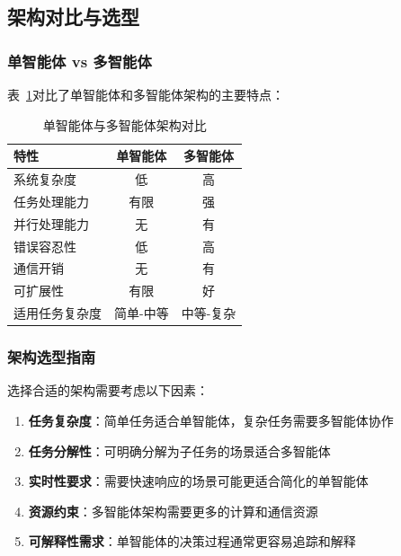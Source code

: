 \subsection{架构对比与选型}

\subsubsection{单智能体 vs 多智能体}

表~\ref{tab:architecture-comparison}对比了单智能体和多智能体架构的主要特点：

\begin{table}[htbp]
    \centering
    \caption{单智能体与多智能体架构对比}
    \label{tab:architecture-comparison}
    \begin{tabular}{@{}lcc@{}}
        \toprule
        \textbf{特性} & \textbf{单智能体} & \textbf{多智能体} \\
        \midrule
        系统复杂度 & 低 & 高 \\
        任务处理能力 & 有限 & 强 \\
        并行处理能力 & 无 & 有 \\
        错误容忍性 & 低 & 高 \\
        通信开销 & 无 & 有 \\
        可扩展性 & 有限 & 好 \\
        适用任务复杂度 & 简单-中等 & 中等-复杂 \\
        \bottomrule
    \end{tabular}
\end{table}

\subsubsection{架构选型指南}

选择合适的架构需要考虑以下因素：

\begin{enumerate}[leftmargin=2em]
    \item \textbf{任务复杂度}：简单任务适合单智能体，复杂任务需要多智能体协作
    \item \textbf{任务分解性}：可明确分解为子任务的场景适合多智能体
    \item \textbf{实时性要求}：需要快速响应的场景可能更适合简化的单智能体
    \item \textbf{资源约束}：多智能体架构需要更多的计算和通信资源
    \item \textbf{可解释性需求}：单智能体的决策过程通常更容易追踪和解释
\end{enumerate}

